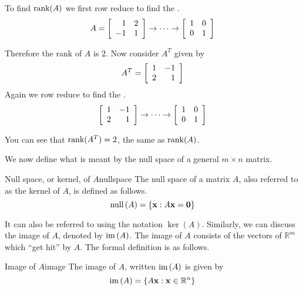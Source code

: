 \begin{solution}
To find $\mbox{rank}(A)$ we first row reduce to find the {\rref}.
\[
A = 
\left[
\begin{array}{rr}
1 & 2 \\
-1 & 1 
\end{array} \right]
\rightarrow \cdots \rightarrow
\left[ \begin{array}{rr}
1 & 0 \\
0 & 1 
\end{array}\right]
\]

Therefore the rank of $A$ is $2$. Now consider $A^T$ given by 
\[
A^T = \left[ \begin{array}{rr}
1 & -1 \\
2 & 1 
\end{array} \right]
\]
Again we row reduce to find the {\rref}.
\[
\left[ \begin{array}{rr}
1 & -1 \\
2 & 1 
\end{array} \right]
\rightarrow \cdots \rightarrow
\left[ \begin{array}{rr}
1 & 0 \\
0 & 1 
\end{array} \right]
\]

You can see that $\mbox{rank}(A^T) = 2$, the same as $\mbox{rank}(A)$. 
\end{solution}

We now define what is meant by the null space of a general $m\times n$ matrix.

\begin{definition}{Null space, or kernel, of $A$}{nullspace}
The null space of a matrix $A$, also referred to as the kernel of $A$, 
is defined as follows.%
\begin{equation*}
\mbox{null} \left( A\right) =\left\{ {\bf x} :A {\bf x} ={\bf 0}\right\}
\end{equation*}
\end{definition}

It can also be referred to using the notation $\ker \left(
A\right) $. 
Similarly, we can discuss the image of $A$, denoted by
$\mbox{im}\left( A\right)$. The image of $A$ consists of the vectors
of $\mathbb{R}^{m}$ which ``get hit'' by $A$.  The formal definition
is as follows.

\begin{definition}{Image of $A$}{image}
The image of $A$, written $\mbox{im}\left( A\right)$ is given by
\[
\mbox{im}\left( A \right) = \left\{ A{\bf x} : {\bf x} \in \mathbb{R}^n \right\}
\]
\end{definition}

